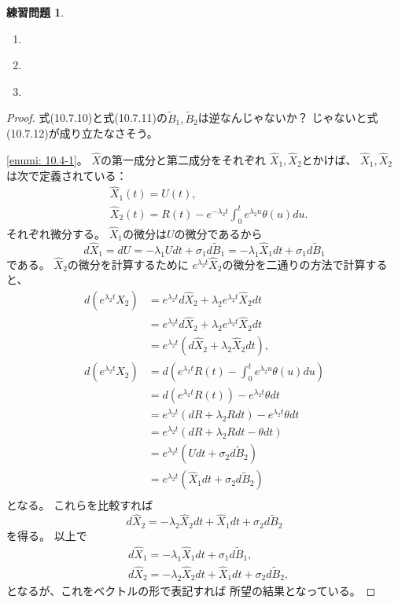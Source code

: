 \documentclass[uplatex]{jsarticle}
\theoremstyle{definition}
\newtheorem{prob}[prob]{練習問題}
\begin{document}
\begin{prob}\label{prob: 10.4}
  \begin{enumerate}
    \item \label{enumi: 10.4-1}
    \item \label{enumi: 10.4-2}
    \item \label{enumi: 10.4-3}
  \end{enumerate}
\end{prob}

\begin{proof}
  式(10.7.10)と式(10.7.11)の\(\tilde{B}_1,\tilde{B}_2\)は逆なんじゃないか？
  じゃないと式(10.7.12)が成り立たなさそう。

  \ref{enumi: 10.4-1}。
  \(\hat{X}\)の第一成分と第二成分をそれぞれ
  \(\hat{X}_1,\hat{X}_2\)とかけば、
  \(\hat{X}_1,\hat{X}_2\)は次で定義されている：
  \begin{align*}
    &\hat{X}_1(t) = U(t), \\
    &\hat{X}_2(t) = R(t) - e^{-\lambda_2t}\int_0^te^{\lambda_2u}\theta(u)du.
  \end{align*}
  それぞれ微分する。
  \(\hat{X}_1\)の微分は\(U\)の微分であるから
  \[
  d\hat{X}_1 = dU = -\lambda_1Udt + \sigma_1d\tilde{B}_1
  = -\lambda_1\hat{X}_1dt + \sigma_1d\tilde{B}_1
  \]
  である。
  \(\hat{X}_2\)の微分を計算するために
  \(e^{\lambda_2t}\hat{X}_2\)の微分を二通りの方法で計算すると、
  \begin{align*}
    d\left(e^{\lambda_2t}\hat{X}_2\right)
    &= e^{\lambda_2t}d\hat{X}_2 + \lambda_2e^{\lambda_2t}\hat{X}_2dt \\
    &= e^{\lambda_2t}d\hat{X}_2
    + \lambda_2e^{\lambda_2t}\hat{X}_2dt \\
    &= e^{\lambda_2t}\left( d\hat{X}_2 + \lambda_2\hat{X}_2dt \right), \\
    d\left(e^{\lambda_2t}\hat{X}_2\right)
    &= d\left( e^{\lambda_2t}R(t)
    - \int_0^te^{\lambda_2u}\theta(u)du\right) \\
    &= d\left( e^{\lambda_2t}R(t) \right)
    - e^{\lambda_2t}\theta dt \\
    &= e^{\lambda_2t}\left( dR + \lambda_2Rdt \right)
    - e^{\lambda_2t}\theta dt \\
    &= e^{\lambda_2t}\left( dR + \lambda_2Rdt - \theta dt \right) \\
    &= e^{\lambda_2t}\left( Udt + \sigma_2d\tilde{B}_2 \right) \\
    &= e^{\lambda_2t}\left( \hat{X}_1dt + \sigma_2d\tilde{B}_2 \right) \\
  \end{align*}
  となる。
  これらを比較すれば
  \[
  d\hat{X}_2 = - \lambda_2\hat{X}_2dt + \hat{X}_1dt + \sigma_2d\tilde{B}_2
  \]
  を得る。
  以上で
  \begin{align*}
    &d\hat{X}_1 = -\lambda_1\hat{X}_1dt + \sigma_1d\tilde{B}_1, \\
    &d\hat{X}_2 = - \lambda_2\hat{X}_2dt + \hat{X}_1dt + \sigma_2d\tilde{B}_2,
  \end{align*}
  となるが、これをベクトルの形で表記すれば
  所望の結果となっている。


\end{proof}
\end{document}
